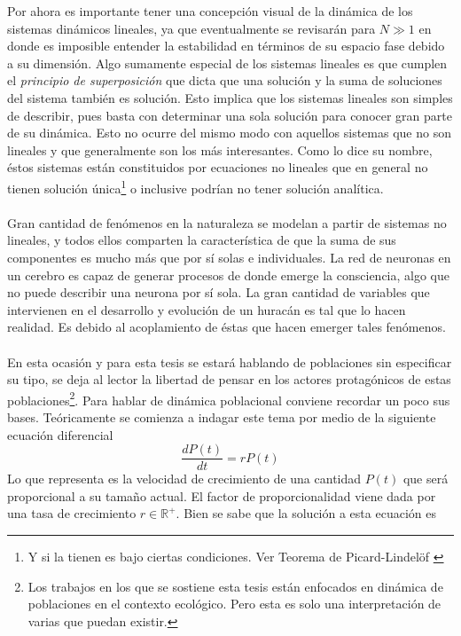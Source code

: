 Por ahora es importante tener una concepción visual de la dinámica de los sistemas dinámicos lineales, ya que eventualmente se revisarán para $N\gg 1$ en donde es imposible entender la estabilidad en términos de su espacio fase debido a su dimensión.
\newpage
Algo sumamente especial de los sistemas lineales es que cumplen el \textit{principio de superposición} que dicta que una solución y la suma de soluciones del sistema también es solución. Esto implica que los sistemas lineales son simples de describir, pues basta con determinar una sola solución para conocer gran parte de su dinámica. Esto no ocurre del mismo modo con aquellos sistemas que no son lineales y que generalmente son los más interesantes. Como lo dice su nombre, éstos sistemas están constituidos por ecuaciones no lineales que en general no tienen solución única\footnote{Y si la tienen es bajo ciertas condiciones. Ver Teorema de Picard-Lindelöf \cite{CauchyLipschitzTheorem}} o inclusive podrían no tener solución analítica.\\
\\
Gran cantidad de fenómenos en la naturaleza se modelan a partir de sistemas no lineales, y todos ellos comparten la característica de que la suma de sus componentes es mucho más que por sí solas e individuales. La red de neuronas en un cerebro es capaz de generar procesos de donde emerge la consciencia, algo que no puede describir una neurona por sí sola. La gran cantidad de variables que intervienen en el desarrollo y evolución de un huracán es tal que lo hacen realidad. Es debido al acoplamiento de éstas que hacen emerger tales fenómenos.\\
\\
En esta ocasión y para esta tesis se estará hablando de poblaciones sin especificar su tipo, se deja al lector la libertad de pensar en los actores protagónicos de estas poblaciones\footnote{Los trabajos en los que se sostiene esta tesis están enfocados en dinámica de poblaciones en el contexto ecológico. Pero esta es solo una interpretación de varias que puedan existir.}. Para hablar de dinámica poblacional conviene recordar un poco sus bases. Teóricamente se comienza a indagar este tema por medio de la siguiente ecuación diferencial
\begin{equation}\label{eqn:CrecimientoExponencial}
	\frac{dP(t)}{dt}=rP(t)
\end{equation}
Lo que representa es la velocidad de crecimiento de una cantidad $P(t)$ que será proporcional a su tamaño actual. El factor de proporcionalidad viene dada por una tasa de crecimiento $r\in\mathbb{R}^+$. Bien se sabe que la solución a esta ecuación es 
